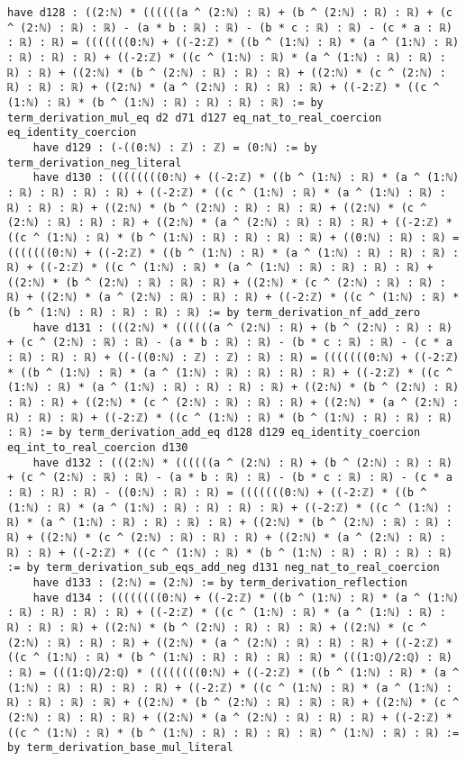 \documentclass{article}
\begin{document}
\begin{tcolorbox}[colback=white!10, width=\linewidth]
\begin{lstlisting}[language=Lean4]
    have d128 : ((2:ℕ) * ((((((a ^ (2:ℕ) : ℝ) + (b ^ (2:ℕ) : ℝ) : ℝ) + (c ^ (2:ℕ) : ℝ) : ℝ) - (a * b : ℝ) : ℝ) - (b * c : ℝ) : ℝ) - (c * a : ℝ) : ℝ) : ℝ) = (((((((0:ℕ) + ((-2:ℤ) * ((b ^ (1:ℕ) : ℝ) * (a ^ (1:ℕ) : ℝ) : ℝ) : ℝ) : ℝ) + ((-2:ℤ) * ((c ^ (1:ℕ) : ℝ) * (a ^ (1:ℕ) : ℝ) : ℝ) : ℝ) : ℝ) + ((2:ℕ) * (b ^ (2:ℕ) : ℝ) : ℝ) : ℝ) + ((2:ℕ) * (c ^ (2:ℕ) : ℝ) : ℝ) : ℝ) + ((2:ℕ) * (a ^ (2:ℕ) : ℝ) : ℝ) : ℝ) + ((-2:ℤ) * ((c ^ (1:ℕ) : ℝ) * (b ^ (1:ℕ) : ℝ) : ℝ) : ℝ) : ℝ) := by term_derivation_mul_eq d2 d71 d127 eq_nat_to_real_coercion eq_identity_coercion
    have d129 : (-((0:ℕ) : ℤ) : ℤ) = (0:ℕ) := by term_derivation_neg_literal
    have d130 : ((((((((0:ℕ) + ((-2:ℤ) * ((b ^ (1:ℕ) : ℝ) * (a ^ (1:ℕ) : ℝ) : ℝ) : ℝ) : ℝ) + ((-2:ℤ) * ((c ^ (1:ℕ) : ℝ) * (a ^ (1:ℕ) : ℝ) : ℝ) : ℝ) : ℝ) + ((2:ℕ) * (b ^ (2:ℕ) : ℝ) : ℝ) : ℝ) + ((2:ℕ) * (c ^ (2:ℕ) : ℝ) : ℝ) : ℝ) + ((2:ℕ) * (a ^ (2:ℕ) : ℝ) : ℝ) : ℝ) + ((-2:ℤ) * ((c ^ (1:ℕ) : ℝ) * (b ^ (1:ℕ) : ℝ) : ℝ) : ℝ) : ℝ) + ((0:ℕ) : ℝ) : ℝ) = (((((((0:ℕ) + ((-2:ℤ) * ((b ^ (1:ℕ) : ℝ) * (a ^ (1:ℕ) : ℝ) : ℝ) : ℝ) : ℝ) + ((-2:ℤ) * ((c ^ (1:ℕ) : ℝ) * (a ^ (1:ℕ) : ℝ) : ℝ) : ℝ) : ℝ) + ((2:ℕ) * (b ^ (2:ℕ) : ℝ) : ℝ) : ℝ) + ((2:ℕ) * (c ^ (2:ℕ) : ℝ) : ℝ) : ℝ) + ((2:ℕ) * (a ^ (2:ℕ) : ℝ) : ℝ) : ℝ) + ((-2:ℤ) * ((c ^ (1:ℕ) : ℝ) * (b ^ (1:ℕ) : ℝ) : ℝ) : ℝ) : ℝ) := by term_derivation_nf_add_zero
    have d131 : (((2:ℕ) * ((((((a ^ (2:ℕ) : ℝ) + (b ^ (2:ℕ) : ℝ) : ℝ) + (c ^ (2:ℕ) : ℝ) : ℝ) - (a * b : ℝ) : ℝ) - (b * c : ℝ) : ℝ) - (c * a : ℝ) : ℝ) : ℝ) + ((-((0:ℕ) : ℤ) : ℤ) : ℝ) : ℝ) = (((((((0:ℕ) + ((-2:ℤ) * ((b ^ (1:ℕ) : ℝ) * (a ^ (1:ℕ) : ℝ) : ℝ) : ℝ) : ℝ) + ((-2:ℤ) * ((c ^ (1:ℕ) : ℝ) * (a ^ (1:ℕ) : ℝ) : ℝ) : ℝ) : ℝ) + ((2:ℕ) * (b ^ (2:ℕ) : ℝ) : ℝ) : ℝ) + ((2:ℕ) * (c ^ (2:ℕ) : ℝ) : ℝ) : ℝ) + ((2:ℕ) * (a ^ (2:ℕ) : ℝ) : ℝ) : ℝ) + ((-2:ℤ) * ((c ^ (1:ℕ) : ℝ) * (b ^ (1:ℕ) : ℝ) : ℝ) : ℝ) : ℝ) := by term_derivation_add_eq d128 d129 eq_identity_coercion eq_int_to_real_coercion d130
    have d132 : (((2:ℕ) * ((((((a ^ (2:ℕ) : ℝ) + (b ^ (2:ℕ) : ℝ) : ℝ) + (c ^ (2:ℕ) : ℝ) : ℝ) - (a * b : ℝ) : ℝ) - (b * c : ℝ) : ℝ) - (c * a : ℝ) : ℝ) : ℝ) - ((0:ℕ) : ℝ) : ℝ) = (((((((0:ℕ) + ((-2:ℤ) * ((b ^ (1:ℕ) : ℝ) * (a ^ (1:ℕ) : ℝ) : ℝ) : ℝ) : ℝ) + ((-2:ℤ) * ((c ^ (1:ℕ) : ℝ) * (a ^ (1:ℕ) : ℝ) : ℝ) : ℝ) : ℝ) + ((2:ℕ) * (b ^ (2:ℕ) : ℝ) : ℝ) : ℝ) + ((2:ℕ) * (c ^ (2:ℕ) : ℝ) : ℝ) : ℝ) + ((2:ℕ) * (a ^ (2:ℕ) : ℝ) : ℝ) : ℝ) + ((-2:ℤ) * ((c ^ (1:ℕ) : ℝ) * (b ^ (1:ℕ) : ℝ) : ℝ) : ℝ) : ℝ) := by term_derivation_sub_eqs_add_neg d131 neg_nat_to_real_coercion
    have d133 : (2:ℕ) = (2:ℕ) := by term_derivation_reflection
    have d134 : ((((((((0:ℕ) + ((-2:ℤ) * ((b ^ (1:ℕ) : ℝ) * (a ^ (1:ℕ) : ℝ) : ℝ) : ℝ) : ℝ) + ((-2:ℤ) * ((c ^ (1:ℕ) : ℝ) * (a ^ (1:ℕ) : ℝ) : ℝ) : ℝ) : ℝ) + ((2:ℕ) * (b ^ (2:ℕ) : ℝ) : ℝ) : ℝ) + ((2:ℕ) * (c ^ (2:ℕ) : ℝ) : ℝ) : ℝ) + ((2:ℕ) * (a ^ (2:ℕ) : ℝ) : ℝ) : ℝ) + ((-2:ℤ) * ((c ^ (1:ℕ) : ℝ) * (b ^ (1:ℕ) : ℝ) : ℝ) : ℝ) : ℝ) * (((1:ℚ)/2:ℚ) : ℝ) : ℝ) = (((1:ℚ)/2:ℚ) * ((((((((0:ℕ) + ((-2:ℤ) * ((b ^ (1:ℕ) : ℝ) * (a ^ (1:ℕ) : ℝ) : ℝ) : ℝ) : ℝ) + ((-2:ℤ) * ((c ^ (1:ℕ) : ℝ) * (a ^ (1:ℕ) : ℝ) : ℝ) : ℝ) : ℝ) + ((2:ℕ) * (b ^ (2:ℕ) : ℝ) : ℝ) : ℝ) + ((2:ℕ) * (c ^ (2:ℕ) : ℝ) : ℝ) : ℝ) + ((2:ℕ) * (a ^ (2:ℕ) : ℝ) : ℝ) : ℝ) + ((-2:ℤ) * ((c ^ (1:ℕ) : ℝ) * (b ^ (1:ℕ) : ℝ) : ℝ) : ℝ) : ℝ) ^ (1:ℕ) : ℝ) : ℝ) := by term_derivation_base_mul_literal

\end{lstlisting}
\end{tcolorbox}
\end{document}
